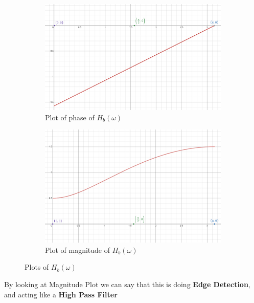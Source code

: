 \documentclass{article}
\begin{document}
\begin{enumerate}
\begin{enumerate}
\begin{enumerate}
                \begin{figure}[h!]
    \centering
    \begin{subfigure}[b]{0.45\linewidth}
        \centering
        \includegraphics[width=\linewidth]{./images/Tutorial_Set_3_Ques_2_part_b_subpart_vi_phase.png}
        \caption{Plot of phase of $H_b(\omega)$}
        \label{fig:phase}
    \end{subfigure}
    \hfill
    \begin{subfigure}[b]{0.45\linewidth}
        \centering
        \includegraphics[width=\linewidth]{./images/Tutorial_Set_3_Ques_2_part_b_subpart_vi_magnitude.png}
        \caption{Plot of magnitude of $H_b(\omega)$}
        \label{fig:magnitude}
    \end{subfigure}
    \caption{Plots of $H_b(\omega)$}
    \label{fig:hb_omega}
\end{figure}


                By looking at Magnitude Plot we can say that this is doing \textbf{Edge Detection}, and acting like a \textbf{High Pass Filter}
        \end{enumerate}       
    \end{enumerate}
    
\end{enumerate}
\end{document}

